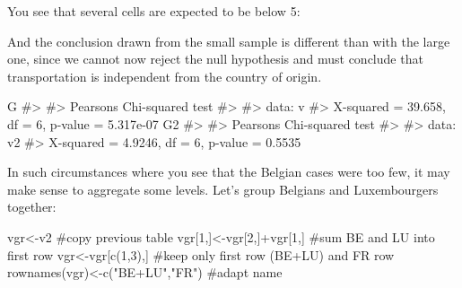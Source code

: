 \documentclass[
  letterpaper,
  DIV=11,
  numbers=noendperiod]{scrreprt}
\newenvironment{Shaded}{\begin{snugshade}}{\end{snugshade}}
\newcommand{\CommentTok}[1]{\textcolor[rgb]{0.37,0.37,0.37}{#1}}
\newcommand{\DecValTok}[1]{\textcolor[rgb]{0.68,0.00,0.00}{#1}}
\newcommand{\FunctionTok}[1]{\textcolor[rgb]{0.28,0.35,0.67}{#1}}
\newcommand{\NormalTok}[1]{\textcolor[rgb]{0.00,0.23,0.31}{#1}}
\newcommand{\OtherTok}[1]{\textcolor[rgb]{0.00,0.23,0.31}{#1}}
\newcommand{\SpecialCharTok}[1]{\textcolor[rgb]{0.37,0.37,0.37}{#1}}
\newcommand{\StringTok}[1]{\textcolor[rgb]{0.13,0.47,0.30}{#1}}
\begin{document}
You see that several cells are expected to be below 5:

\begin{Shaded}
\end{Shaded}

And the conclusion drawn from the small sample is different than with
the large one, since we cannot now reject the null hypothesis and must
conclude that transportation is independent from the country of origin.

\begin{Shaded}
\begin{Highlighting}[]
\NormalTok{G}
\CommentTok{\#\textgreater{} }
\CommentTok{\#\textgreater{}  Pearson\textquotesingle{}s Chi{-}squared test}
\CommentTok{\#\textgreater{} }
\CommentTok{\#\textgreater{} data:  v}
\CommentTok{\#\textgreater{} X{-}squared = 39.658, df = 6, p{-}value = 5.317e{-}07}
\NormalTok{G2}
\CommentTok{\#\textgreater{} }
\CommentTok{\#\textgreater{}  Pearson\textquotesingle{}s Chi{-}squared test}
\CommentTok{\#\textgreater{} }
\CommentTok{\#\textgreater{} data:  v2}
\CommentTok{\#\textgreater{} X{-}squared = 4.9246, df = 6, p{-}value = 0.5535}
\end{Highlighting}
\end{Shaded}

In such circumstances where you see that the Belgian cases were too few,
it may make sense to aggregate some levels. Let's group Belgians and
Luxembourgers together:

\begin{Shaded}
\begin{Highlighting}[]
\NormalTok{vgr}\OtherTok{\textless{}{-}}\NormalTok{v2  }\CommentTok{\#copy previous table}
\NormalTok{vgr[}\DecValTok{1}\NormalTok{,]}\OtherTok{\textless{}{-}}\NormalTok{vgr[}\DecValTok{2}\NormalTok{,]}\SpecialCharTok{+}\NormalTok{vgr[}\DecValTok{1}\NormalTok{,] }\CommentTok{\#sum BE and LU into first row}
\NormalTok{vgr}\OtherTok{\textless{}{-}}\NormalTok{vgr[}\FunctionTok{c}\NormalTok{(}\DecValTok{1}\NormalTok{,}\DecValTok{3}\NormalTok{),] }\CommentTok{\#keep only first row (BE+LU) and FR row}
\FunctionTok{rownames}\NormalTok{(vgr)}\OtherTok{\textless{}{-}}\FunctionTok{c}\NormalTok{(}\StringTok{"BE+LU"}\NormalTok{,}\StringTok{"FR"}\NormalTok{) }\CommentTok{\#adapt name}
\end{Highlighting}
\end{Shaded}
\end{document}
